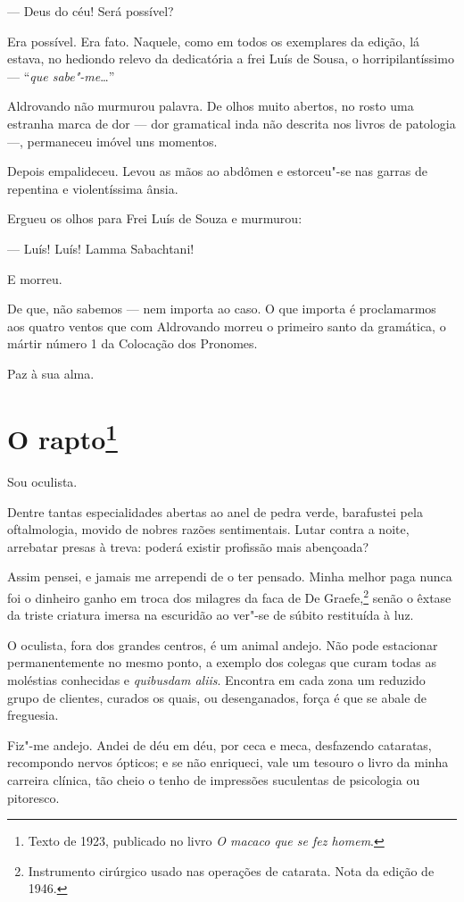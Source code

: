--- Deus do céu! Será possível?

Era possível. Era fato. Naquele, como em todos os exemplares da edição,
lá estava, no hediondo relevo da dedicatória a frei Luís de Sousa, o
horripilantíssimo --- ``\emph{que sabe"-me}\ldots{}''

Aldrovando não murmurou palavra. De olhos muito abertos, no rosto uma
estranha marca de dor --- dor gramatical inda não descrita nos livros de
patologia ---, permaneceu imóvel uns momentos.

Depois empalideceu. Levou as mãos ao abdômen e estorceu"-se nas garras de
repentina e violentíssima ânsia.

Ergueu os olhos para Frei Luís de Souza e murmurou:

--- Luís! Luís! Lamma Sabachtani!

E morreu.

De que, não sabemos --- nem importa ao caso. O que importa é
proclamarmos aos quatro ventos que com Aldrovando morreu o primeiro
santo da gramática, o mártir número 1 da Colocação dos Pronomes.

Paz à sua alma.

\chapter{O rapto\footnote[*]{Texto de 1923, publicado no livro \emph{O macaco que se fez homem}.}}

Sou oculista.

Dentre tantas especialidades abertas ao anel de pedra verde, barafustei
pela oftalmologia, movido de nobres razões sentimentais. Lutar contra a
noite, arrebatar presas à treva: poderá existir profissão mais
abençoada?

Assim pensei, e jamais me arrependi de o ter pensado. Minha melhor paga
nunca foi o dinheiro ganho em troca dos milagres da faca de De
Graefe,\footnote{Instrumento cirúrgico usado nas operações de catarata.
  Nota da edição de 1946.} senão o êxtase da triste criatura imersa na
escuridão ao ver"-se de súbito restituída à luz.

O oculista, fora dos grandes centros, é um animal andejo. Não pode
estacionar permanentemente no mesmo ponto, a exemplo dos colegas que
curam todas as moléstias conhecidas e \emph{quibusdam aliis}. Encontra
em cada zona um reduzido grupo de clientes, curados os quais, ou
desenganados, força é que se abale de freguesia.

Fiz"-me andejo. Andei de déu em déu, por ceca e meca, desfazendo
cataratas, recompondo nervos ópticos; e se não enriqueci, vale um
tesouro o livro da minha carreira clínica, tão cheio o tenho de
impressões suculentas de psicologia ou pitoresco.

